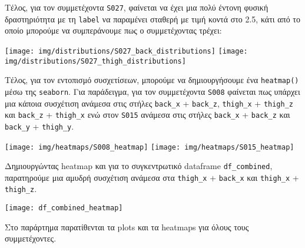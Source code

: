         Τέλος, για τον συμμετέχοντα \texttt{S027}, φαίνεται να έχει μια πολύ έντονη φυσική δραστηριότητα με τη \texttt{label}
        να παραμένει σταθερή με τιμή κοντά στο 2.5, κάτι από το οποίο μπορούμε να συμπεράνουμε πως ο συμμετέχοντας τρέχει:

        \begin{multicols}{2} \centering
            \noindent\texttt{[image: img/distributions/S027\_back\_distributions]}
            \texttt{[image: img/distributions/S027\_thigh\_distributions]}
        \end{multicols}

        Τέλος, για τον εντοπισμό συσχετίσεων, μπορούμε να δημιουργήσουμε ένα \texttt{heatmap()} μέσω της \texttt{seaborn}.
        Για παράδειγμα, για τον συμμετέχοντα \texttt{S008} φαίνεται πως υπάρχει μια κάποια συσχέτιση ανάμεσα στις στήλες \verb|back_x| + \verb|back_z|,
        \verb|thigh_x| + \verb|thigh_z| και \verb|back_z| + \verb|thigh_x| ενώ στον \texttt{S015} ανάμεσα στις στήλες \verb|back_x| + \verb|back_z| και \verb|back_y| + \verb|thigh_y|.

        \begin{multicols}{2} \centering
            \noindent\texttt{[image: img/heatmaps/S008\_heatmap]}
            \texttt{[image: img/heatmaps/S015\_heatmap]}
        \end{multicols}

        Δημιουργώντας heatmap και για το συγκεντρωτικό dataframe \verb|df_combined|, παρατηρούμε μια  αμυδρή συσχέτιση
        ανάμεσα στα \verb|thigh_x| + \verb|back_x| και \verb|thigh_x| + \verb|thigh_z|.

        \vspace{-5pt}
        \begin{center}
            \texttt{[image: df\_combined\_heatmap]}
        \end{center}

        \begin{graycomment} \centering
            Στο παράρτημα παρατίθενται τα plots και τα heatmaps για όλους τους συμμετέχοντες.
        \end{graycomment}